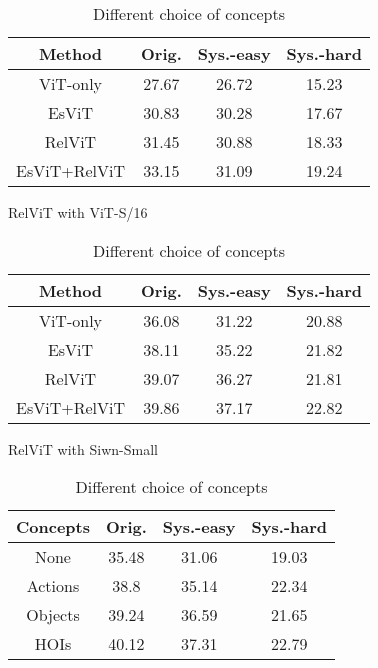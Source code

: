 \documentclass{article} \usepackage{iclr2022_conference,times}
\begin{document}
\begin{table}[h]
    \centering
    \setlength\tabcolsep{3pt}
    \begin{subtable}[t]{0.49\textwidth}
        \centering
    \begin{tabular}{cccc}
    \toprule
         Method & Orig.& Sys.-easy & Sys.-hard  \\
    \midrule
         ViT-only &27.67 &26.72 &15.23 \\
         EsViT &30.83 &30.28 &17.67 \\
         RelViT &31.45 &30.88 &18.33 \\
         EsViT+RelViT &33.15 &31.09 &19.24 \\
    \bottomrule
    \end{tabular}
    \caption{RelViT with ViT-S/16}
    \label{tab:quant_a}
    \end{subtable}
    \hfill
    \setlength\tabcolsep{3pt}
    \begin{subtable}[t]{0.49\textwidth}
        \centering
    \begin{tabular}{cccc}
    \toprule
         Method & Orig. &Sys.-easy & Sys.-hard  \\
    \midrule
         ViT-only &36.08 &31.22 &20.88 \\
         EsViT &38.11 &35.22 &21.82 \\
         RelViT &39.07 &36.27 &21.81 \\
         EsViT+RelViT &39.86 &37.17 &22.82 \\
    \bottomrule
    \end{tabular}
    \caption{RelViT with Siwn-Small}
    \label{tab:quant_b}
    \end{subtable}
    \vfill
    \setlength\tabcolsep{3pt}
    \begin{subtable}[t]{0.49\textwidth}
    \centering
    \begin{tabular}{cccc}
    \toprule
         Concepts & Orig.& Sys.-easy & Sys.-hard  \\
    \midrule
         None &35.48 &31.06 &19.03 \\
         Actions &38.8 &35.14 &22.34 \\
         Objects &39.24 &36.59 &21.65 \\
         HOIs &40.12 &37.31 &22.79 \\
    \bottomrule
    \end{tabular}
    \caption{Different choice of concepts}
    \label{tab:quant_c}
    \end{subtable}
    \hfill
    \setlength\tabcolsep{3pt}

\end{table}
\end{document}

